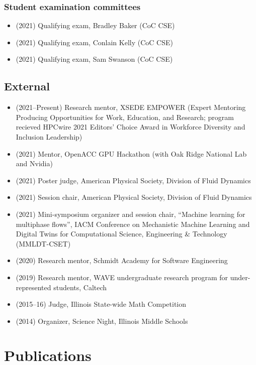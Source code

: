 \subsubsection{Student examination committees}
\begin{itemize}
    \item (2021) Qualifying exam, Bradley Baker (CoC CSE)
    \item (2021) Qualifying exam, Conlain Kelly (CoC CSE)
    \item (2021) Qualifying exam, Sam Swanson (CoC CSE)
\end{itemize}

\subsection{External}
\begin{itemize}
    \item (2021--Present) Research mentor, XSEDE EMPOWER (Expert Mentoring Producing Opportunities for Work, Education, and Research; program recieved HPCwire 2021 Editors' Choice Award in Workforce Diversity and Inclusion Leadership)
    \item (2021) Mentor, OpenACC GPU Hackathon (with Oak Ridge National Lab and Nvidia)
    \item (2021) Poster judge, American Physical Society, Division of Fluid Dynamics
    \item (2021) Session chair, American Physical Society, Division of Fluid Dynamics
    \item (2021) Mini-symposium organizer and session chair, ``Machine learning for multiphase flows'', IACM Conference on Mechanistic Machine Learning and Digital Twins for Computational Science, Engineering \& Technology (MMLDT-CSET)
    \item (2020) Research mentor, Schmidt Academy for Software Engineering
    \item (2019) Research mentor, WAVE undergraduate research program for under-represented students, Caltech
    \item (2015--16) Judge, Illinois State-wide Math Competition
    \item (2014) Organizer, Science Night, Illinois Middle Schools
\end{itemize}



\section{Publications}

